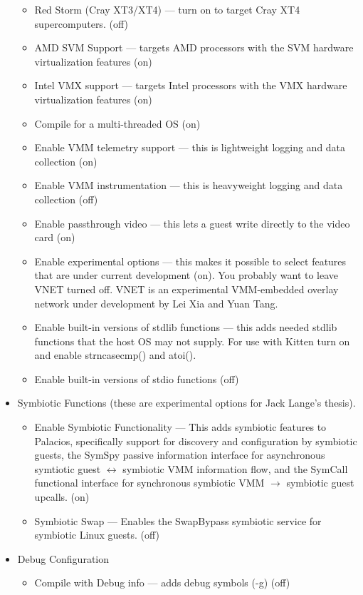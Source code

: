 \documentclass[11pt]{article}
\begin{document}
\begin{itemize}
\begin{itemize}
\item Red Storm (Cray XT3/XT4) --- turn on to target Cray XT4
supercomputers.  (off)
\item AMD SVM Support --- targets AMD processors with the SVM hardware
virtualization features (on)
\item Intel VMX support --- targets Intel processors with the VMX
hardware virtualization features (on)
\item Compile for a multi-threaded OS (on)
\item Enable VMM telemetry support --- this is lightweight logging and
data collection (on)  
\item Enable VMM instrumentation --- this is heavyweight logging and
data collection (off)
\item Enable passthrough video --- this lets a guest write directly to
the video card (on)
\item Enable experimental options --- this makes it possible to select
features that are under current development (on).  You probably want
to leave VNET turned off.  VNET is an experimental VMM-embedded
overlay network under development by Lei Xia and Yuan Tang.
\item Enable built-in versions of stdlib functions --- this adds
needed stdlib functions that the host OS may not supply.  For use with
Kitten turn on and enable strncasecmp() and atoi().
\item Enable built-in versions of stdio functions (off)
\end{itemize}
\item Symbiotic Functions (these are experimental options for Jack
Lange's thesis). 
\begin{itemize}
\item Enable Symbiotic Functionality --- This adds symbiotic features
to Palacios, specifically support for discovery and configuration by
symbiotic guests, the SymSpy passive information interface for
asynchronous symtiotic guest $\leftrightarrow$ symbiotic VMM
information flow, and the SymCall functional interface for synchronous
symbiotic VMM $\rightarrow$ symbiotic guest upcalls.  (on)
\item Symbiotic Swap --- Enables the SwapBypass symbiotic service for
symbiotic Linux guests.  (off)
\end{itemize}
\item Debug Configuration
\begin{itemize}
\item Compile with Debug info --- adds debug symbols (-g)  (off)

\end{itemize}
\end{itemize}
\end{document}
